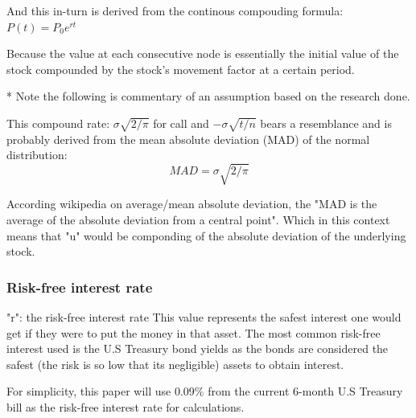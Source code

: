 \documentclass[12pt, letterpaper]{article}
\begin{document}
And this in-turn is derived from the continous compouding formula: %
${P(t)} = {P}_{0}e^{rt}$

Because the value at each consecutive node is essentially the initial value of the stock compounded by the stock's movement factor at a certain period.

* Note the following is commentary of an assumption based on the research done.

This compound rate: ${\sigma\sqrt{2/\pi}}$ for call and ${-\sigma\sqrt{t/n}}$ bears a resemblance and is probably derived from the mean absolute deviation (MAD) of the normal distribution:
\begin{equation*}
  MAD = \sigma\sqrt{2/\pi}
\end{equation*}

According wikipedia on average/mean absolute deviation, the "MAD is the average of the absolute deviation from a central point".
Which in this context means that "u" would be componding of the absolute deviation of the underlying stock.

\subsubsection*{Risk-free interest rate}

"r": the risk-free interest rate %
This value represents the safest interest one would get if they were to put the money in that asset.
The most common risk-free interest used is the U.S Treasury bond yields as the bonds are considered the safest (the risk is so low that its negligible) assets to obtain interest.

For simplicity, this paper will use 0.09\% from the current 6-month U.S Treasury bill as the risk-free interest rate for calculations.
\end{document}
